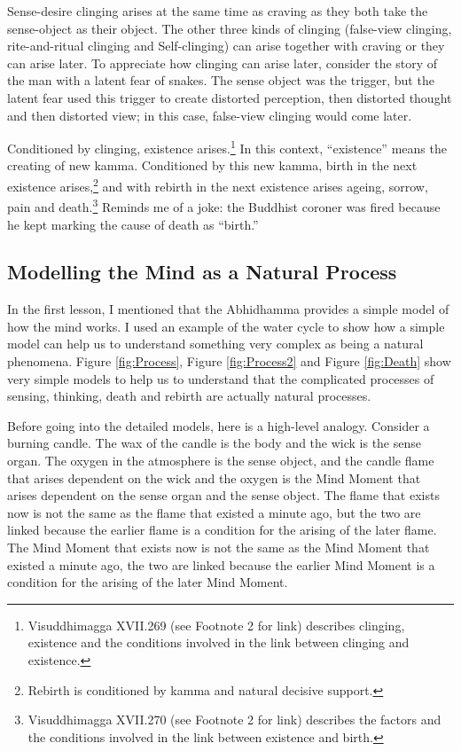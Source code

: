 Sense-desire clinging arises at the same time as craving as they both take the sense-object as their object. The other three kinds of clinging (false-view clinging, rite-and-ritual clinging and Self-clinging) can arise together with craving or they can arise later. To appreciate how clinging can arise later, consider the story of the man with a latent fear of snakes. The sense object was the trigger, but the latent fear used this trigger to create distorted perception, then distorted thought and then distorted view; in this case, false-view clinging would come later.

Conditioned by clinging, existence arises.\footnote{Visuddhimagga XVII.269 (see Footnote 2 for link) describes clinging, existence and the conditions involved in the link between clinging and existence.} In this context, “existence” means the creating of new kamma. Conditioned by this new kamma, birth in the next existence arises,\footnote{Rebirth is conditioned by kamma and natural decisive support.} and with rebirth in the next existence arises ageing, sorrow, pain and death.\footnote{Visuddhimagga XVII.270 (see Footnote 2 for link) describes the factors and the conditions involved in the link between existence and birth.} Reminds me of a joke: the Buddhist coroner was fired because he kept marking the cause of death as “birth.” 

\subsection*{Modelling the Mind as a Natural Process}

In the first lesson, I mentioned that the Abhidhamma provides a simple model of how the mind works. I used an example of the water cycle to show how a simple model can help us to understand something very complex as being a natural phenomena. Figure \ref{fig:Process}, Figure \ref{fig:Process2} and Figure \ref{fig:Death} show very simple models to help us to understand that the complicated processes of sensing, thinking, death and rebirth are actually natural processes.

Before going into the detailed models, here is a high-level analogy. Consider a burning candle. The wax of the candle is the body and the wick is the sense organ. The oxygen in the atmosphere is the sense object, and the candle flame that arises dependent on the wick and the oxygen is the Mind Moment that arises dependent on the sense organ and the sense object. The flame that exists now is not the same as the flame that existed a minute ago, but the two are linked because the earlier flame is a condition for the arising of the later flame. The Mind Moment that exists now is not the same as the Mind Moment that existed a minute ago, the two are linked because the earlier Mind Moment is a condition for the arising of the later Mind Moment. 

